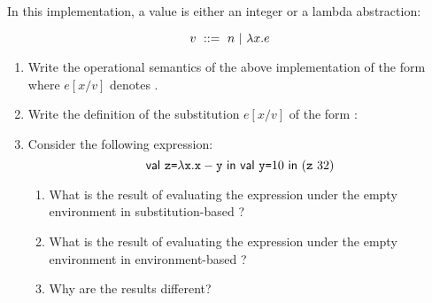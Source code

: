 \begin{enumerate}
In this implementation, a value is either an integer or a lambda abstraction:

\[ v\ ::=\ n\ |\ \lambda x.e \]

\begin{enumerate}
  \item
    Write the operational semantics of the above implementation
    of the form 
    where $e[x/v]$ denotes .

  \item Write the definition of the substitution $e[x/v]$
    of the form :

  \item Consider the following expression:
\[
\ebind{\code{z}}{\efun{\cx}{\esub{\cx}{\cy}}}{
    \ebind{\cy}{10}{
        (\eapp{\code{z}}{32})
    }
}
\]

\begin{enumerate}
\item What is the result of evaluating the expression under the empty
  environment in substitution-based \lang?
\item What is the result of evaluating the expression under the empty
  environment in environment-based \lang?
\item Why are the results different?
\end{enumerate}
\end{enumerate}


\end{enumerate}
